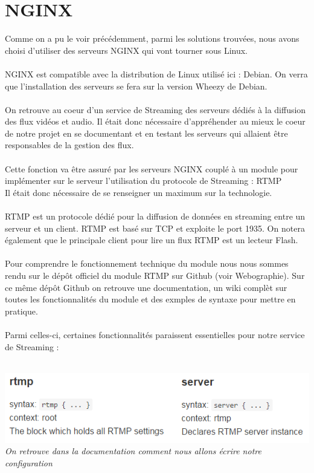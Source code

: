 \documentclass{report}
\begin{document}
    \section{NGINX} 
    Comme on a pu le voir précédemment, parmi les solutions trouvées, nous avons choisi d’utiliser des serveurs NGINX qui vont tourner sous Linux.
    \\
    \\
    NGINX est compatible avec la distribution de Linux utilisé ici : Debian. On verra que l'installation des serveurs se fera sur la version Wheezy de Debian.
    \\
    \\
    
    On retrouve au coeur d’un service de Streaming des serveurs dédiés à la diffusion des flux vidéos et audio. Il était donc nécessaire d’appréhender au mieux le coeur de notre projet en se documentant et en testant les serveurs qui allaient être responsables de la gestion des flux.
    \\
    \\
    Cette fonction va être assuré par les serveurs NGINX couplé à un module pour implémenter sur le serveur l’utilisation du protocole de Streaming : RTMP
    \\
    \hfill
    Il était donc nécessaire de se renseigner un maximum sur la technologie.
    \\
    \\
    RTMP est un protocole dédié pour la diffusion de données en streaming entre un serveur et un client. RTMP est basé sur TCP et exploite le port 1935. On notera également que le principale client pour lire un flux RTMP est un lecteur Flash.
    \\
    \\
    Pour comprendre le fonctionnement technique du module nous nous sommes rendu sur le dépôt officiel du module RTMP sur Github (voir Webographie). Sur ce même dépôt Github on retrouve une documentation, un wiki complèt sur toutes les fonctionnalités du module et des exmples de syntaxe pour mettre en pratique.
    \\
    \\
    Parmi celles-ci, certaines fonctionnalités paraissent essentielles pour notre service de Streaming :
    \\
    \\
    
    \begin{center}
    \includegraphics[width=16cm]{img/nginx3.PNG}
    \textit{\small{On retrouve dans la documentation comment nous allons écrire notre configuration}}
    \end{center}
    \\
    \\
    
\end{document}
